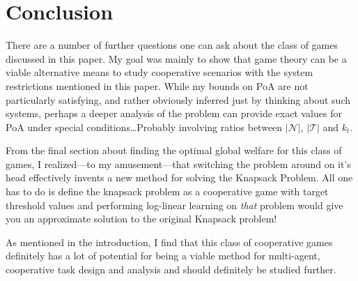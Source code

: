 \documentclass[11pt, onecolumn, compsoc, letterpaper]{article}
\newcommand{\Pl}{\mathcal{N}} %
\newcommand{\Ta}{\mathcal{T}} %
\begin{document}
\section{Conclusion}
There are a number of further questions one can ask about the class of games discussed in this paper. My goal was mainly to show that game theory can be a viable alternative means to study cooperative scenarios with the system restrictions mentioned in this paper. While my bounds on PoA are not particularly satisfying, and rather obviously inferred just by thinking about such systems, perhaps a deeper analysis of the problem can provide exact values for PoA under special conditions\ldots Probably involving ratios between $|\Pl|$, $|\Ta|$ and $k_t$.

From the final section about finding the optimal global welfare for this class of games, I realized---to my amusement---that switching the problem around on it's head effectively invents a new method for solving the Knapsack Problem. All one has to do is define the knapsack problem as a cooperative game with target threshold values and performing log-linear learning on \emph{that} problem would give you an approximate solution to the original Knapsack problem!

As mentioned in the introduction, I find that this class of cooperative games definitely has a lot of potential for being a viable method for multi-agent, cooperative task design and analysis and should definitely be studied further.




\end{document}

